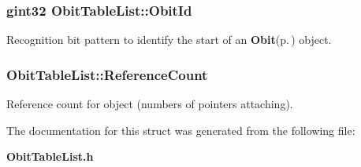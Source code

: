 \subsubsection{\setlength{\rightskip}{0pt plus 5cm}gint32 {\bf Obit\-Table\-List::Obit\-Id}}\label{structObitTableList_o0}


Recognition bit pattern to identify the start of an {\bf Obit}{\rm (p.\,\pageref{structObit})} object. 

\subsubsection{ {\bf Obit\-Table\-List::Reference\-Count}}\label{structObitTableList_o2}


Reference count for object (numbers of pointers attaching). 



The documentation for this struct was generated from the following file:\begin{CompactItemize}
\item 
{\bf Obit\-Table\-List.h}\end{CompactItemize}
